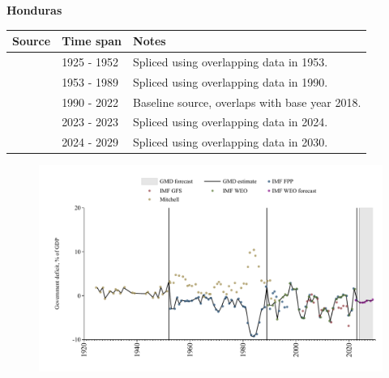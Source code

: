 \documentclass[12pt,a4paper,landscape]{article}
\begin{document}
\begin{adjustbox}{max totalsize={\paperwidth}{\paperheight},center}
\begin{minipage}[t][\textheight][t]{\textwidth}
\vspace*{0.5cm}
{}
\begin{center}
{\Large\bfseries Honduras}
\end{center}
\vspace{0.5cm}
\begin{table}[H]
\centering
\small
\begin{tabular}{|l|l|l|}
\hline
\textbf{Source} & \textbf{Time span} & \textbf{Notes} \\
\hline
\rowcolor{white}\cite{Mitchell}& 1925 - 1952 &Spliced using overlapping data in 1953.\\
\rowcolor{lightgray}\cite{IMF_FPP}& 1953 - 1989 &Spliced using overlapping data in 1990.\\
\rowcolor{white}\cite{IMF_WEO}& 1990 - 2022 &Baseline source, overlaps with base year 2018.\\
\rowcolor{lightgray}\cite{IMF_FPP}& 2023 - 2023 &Spliced using overlapping data in 2024.\\
\rowcolor{white}\cite{IMF_WEO_forecast}& 2024 - 2029 &Spliced using overlapping data in 2030.\\
\hline
\end{tabular}
\end{table}
\begin{figure}[H]
\centering
\includegraphics[width=\textwidth,height=0.6\textheight,keepaspectratio]{graphs/HND_govdef_GDP.pdf}
\end{figure}
\end{minipage}
\end{adjustbox}
\end{document}
